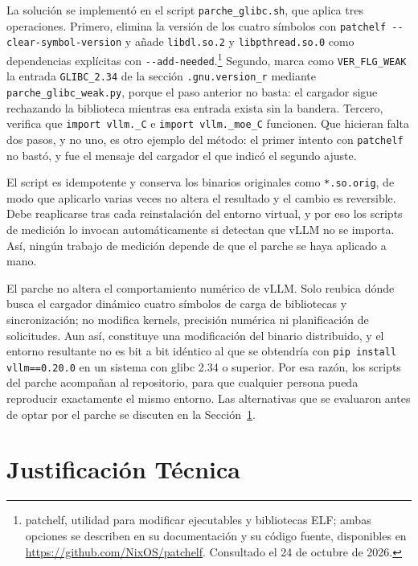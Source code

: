 La solución se implementó en el script \texttt{parche\_glibc.sh}, que aplica tres operaciones. Primero, elimina la versión de los cuatro símbolos con \texttt{patchelf -{}-clear-symbol-version} y añade \texttt{libdl.so.2} y \texttt{libpthread.so.0} como dependencias explícitas con \texttt{-{}-add-needed}.\footnote{patchelf, utilidad para modificar ejecutables y bibliotecas ELF; ambas opciones se describen en su documentación y su código fuente, disponibles en \url{https://github.com/NixOS/patchelf}. Consultado el 24 de octubre de 2026.}
Segundo, marca como \texttt{VER\_FLG\_WEAK} la entrada \texttt{GLIBC\_2.34} de la sección \texttt{.gnu.\allowbreak version\_r} mediante \texttt{parche\_\allowbreak glibc\_\allowbreak weak.py}, porque el paso anterior no basta: el cargador sigue rechazando la biblioteca mientras esa entrada exista sin la bandera. Tercero, verifica que \texttt{import vllm.\_C} e \texttt{import vllm.\_moe\_C} funcionen. Que hicieran falta dos pasos, y no uno, es otro ejemplo del método: el primer intento con \texttt{patchelf} no bastó, y fue el mensaje del cargador el que indicó el segundo ajuste.

El script es idempotente y conserva los binarios originales como \texttt{*.so.orig}, de modo que aplicarlo varias veces no altera el resultado y el cambio es reversible. Debe reaplicarse tras cada reinstalación del entorno virtual, y por eso los scripts de medición lo invocan automáticamente si detectan que vLLM no se importa. Así, ningún trabajo de medición depende de que el parche se haya aplicado a mano.

El parche no altera el comportamiento numérico de vLLM. Solo reubica dónde busca el cargador dinámico cuatro símbolos de carga de bibliotecas y sincronización; no modifica kernels, precisión numérica ni planificación de solicitudes. Aun así, constituye una modificación del binario distribuido, y el entorno resultante no es bit a bit idéntico al que se obtendría con \texttt{pip install vllm==0.20.0} en un sistema con glibc 2.34 o superior. Por esa razón, los scripts del parche acompañan al repositorio, para que cualquier persona pueda reproducir exactamente el mismo entorno. Las alternativas que se evaluaron antes de optar por el parche se discuten en la Sección~\ref{sec:cap2:justificacion}.

\section{Justificación Técnica}
\label{sec:cap2:justificacion}


